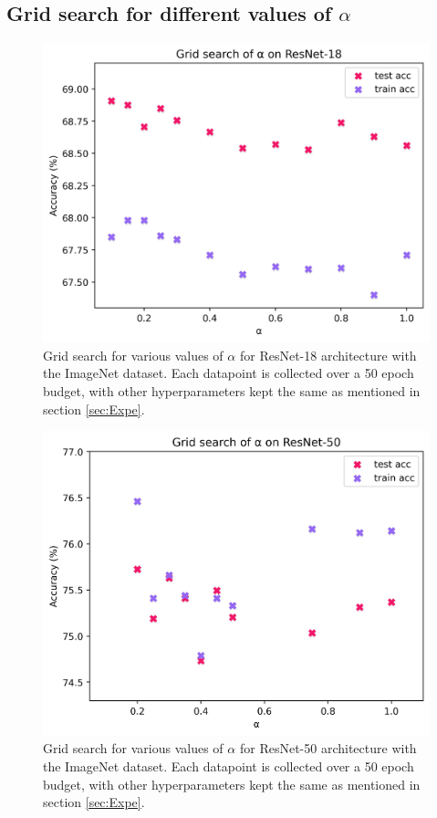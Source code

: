 \documentclass[runningheads]{llncs}
\begin{document}
\clearpage

\subsection{Grid search for different values of $\alpha$}


\begin{figure}[ht]
\centering
\includegraphics[width=0.5\columnwidth]{r18_grid_search}
\caption{ Grid search for various values of $\alpha$ for ResNet-18 architecture with the
ImageNet dataset. Each datapoint is collected over a 50 epoch budget, with other
hyperparameters kept the same as mentioned in section \ref{sec:Expe}. }
\label{fig:grid_searcha}
\end{figure}


\begin{figure}[ht]
\centering
\includegraphics[width=0.5\columnwidth]{r50_grid_search}
\caption{ Grid search for various values of $\alpha$ for ResNet-50 architecture with the
ImageNet dataset. Each datapoint is collected over a 50 epoch budget, with other
hyperparameters kept the same as mentioned in section \ref{sec:Expe}. }
\label{fig:grid_searchb}
\end{figure}


\clearpage
\end{document}
